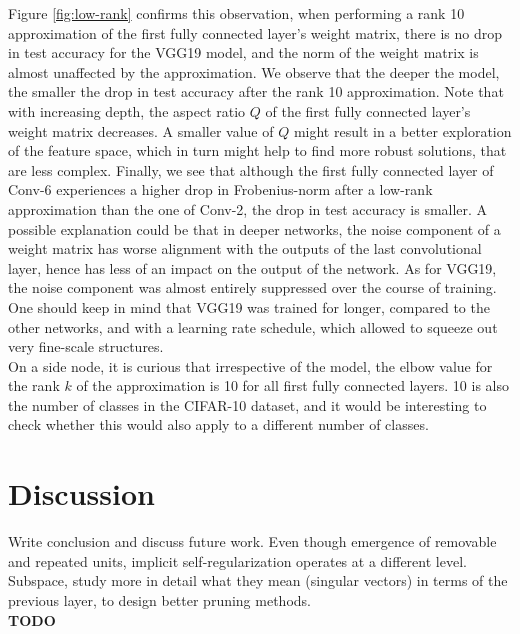 Figure \ref{fig:low-rank} confirms this observation, when performing a rank 10 approximation of the first fully connected layer's weight matrix, there is no drop in test accuracy for the VGG19 model, and the norm of the weight matrix is almost unaffected by the approximation. We observe that the deeper the model, the smaller the drop in test accuracy after the rank 10 approximation. Note that with increasing depth, the aspect ratio $Q$ of the first fully connected layer's weight matrix decreases. A smaller value of $Q$ might result in a better exploration of the feature space, which in turn might help to find more robust solutions, that are less complex. Finally, we see that although the first fully connected layer of Conv-6 experiences a higher drop in Frobenius-norm after a low-rank approximation than the one of Conv-2, the drop in test accuracy is smaller. A possible explanation could be that in deeper networks, the noise component of a weight matrix has worse alignment with the outputs of the last convolutional layer, hence has less of an impact on the output of the network. As for VGG19, the noise component was almost entirely suppressed over the course of training. One should keep in mind that VGG19 was trained for longer, compared to the other networks, and with a learning rate schedule, which allowed to squeeze out very fine-scale structures. \\

On a side node, it is curious that irrespective of the model, the elbow value for the rank $k$ of the approximation is 10 for all first fully connected layers. 10 is also the number of classes in the CIFAR-10 dataset, and it would be interesting to check whether this would also apply to a different number of classes. \\

\section{Discussion}

Write conclusion and discuss future work. Even though emergence of removable and repeated units, implicit self-regularization operates at a different level. Subspace, study more in detail what they mean (singular vectors) in terms of the previous layer, to design better pruning methods. \\

\textbf{TODO}

\nocite{*}
\printbibliography


